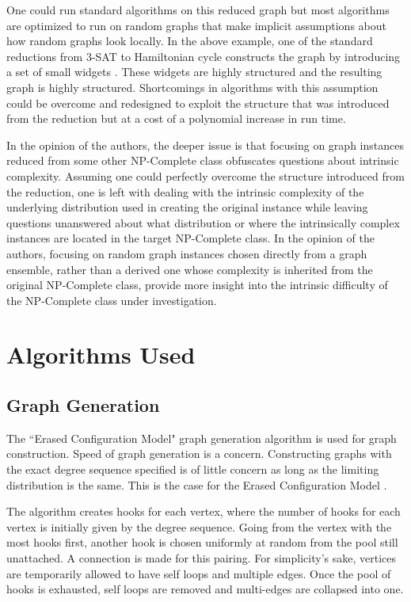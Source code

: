 \documentclass[twoside,11pt]{article}
\begin{document}
One could run standard algorithms on this reduced graph but most algorithms
are optimized to run on random graphs that make implicit assumptions about how random graphs look locally.
In the above example, one of the standard reductions from 3-SAT to
Hamiltonian cycle constructs the graph by introducing a set of small widgets \cite{cormen}.
These widgets are highly structured
and the resulting graph is highly structured.
Shortcomings in algorithms
with this assumption could be overcome and redesigned to exploit the structure that was introduced
from the reduction but at a cost of a polynomial increase in run time.

In the opinion of the authors,
the deeper issue is that focusing on graph instances reduced from some other NP-Complete
class obfuscates questions about intrinsic complexity.
Assuming one could perfectly overcome the structure introduced from the reduction, one is left with dealing
with the intrinsic complexity of the underlying distribution used in creating the original instance
while leaving questions unanswered about what distribution or where the intrinsically complex instances are located
in the target NP-Complete class.
In the opinion of the authors,
focusing on random graph instances chosen directly from a graph ensemble, rather than a derived one whose
complexity is inherited from the original NP-Complete class, provide more insight into the intrinsic difficulty
of the NP-Complete class under investigation.

\section{Algorithms Used}
\label{culb-van}

\subsection{Graph Generation}

The ``Erased Configuration Model" \cite{molloy}
graph generation algorithm is used
for graph construction.
Speed of graph generation is a concern.
Constructing graphs with the exact degree sequence specified
is of little concern as long as the limiting distribution
is the same.
This is the case for the Erased Configuration Model \cite{britton}.

The algorithm creates hooks for each vertex, where the number of hooks for each vertex is initially given by the degree
sequence.  Going from the vertex with the most hooks first, another hook is chosen uniformly at random from the pool
still unattached.  A connection is made for this pairing.
For simplicity's sake, vertices are temporarily allowed to have self loops
and multiple edges.  Once the pool of hooks is exhausted, self loops are removed and multi-edges are collapsed
into one.  
\end{document}
